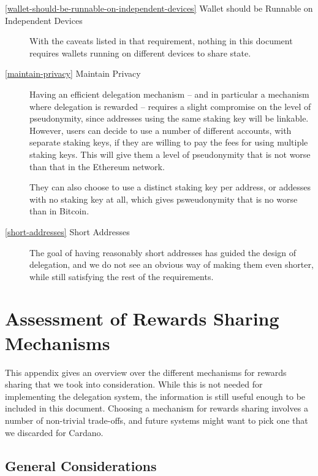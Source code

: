 \documentclass[11pt,a4paper]{article}
\begin{document}
\begin{description}
\item[\cref{wallet-should-be-runnable-on-independent-devices} Wallet
  should be Runnable on Independent Devices] With the caveats listed
  in that requirement, nothing in this document requires wallets
  running on different devices to share state.

\item[\cref{maintain-privacy} Maintain Privacy] Having an efficient
  delegation mechanism -- and in particular a mechanism where
  delegation is rewarded -- requires a slight compromise on the level
  of pseudonymity, since addresses using the same staking key will be
  linkable. However, users can decide to use a number of different
  accounts, with separate staking keys, if they are willing to pay the
  fees for using multiple staking keys. This will give them a level of
  pseudonymity that is not worse than that in the Ethereum network.

  They can also choose to use a distinct staking key per address, or addesses
  with no staking key at all, which gives psweudonymity that is no worse than in
  Bitcoin.

\item[\cref{short-addresses} Short Addresses] The goal of having
  reasonably short addresses has guided the design of delegation, and
  we do not see an obvious way of making them even shorter, while
  still satisfying the rest of the requirements.

\end{description}

\appendix

\section{Assessment of Rewards Sharing Mechanisms}
\label{assessment-of-rewards-sharing-mechanisms}

This appendix gives an overview over the different mechanisms for
rewards sharing that we took into consideration. While this is not
needed for implementing the delegation system, the information is
still useful enough to be included in this document. Choosing a
mechanism for rewards sharing involves a number of non-trivial
trade-offs, and future systems might want to pick one that we
discarded for Cardano.

\subsection{General Considerations}
\label{general-considerations}
\end{document}
